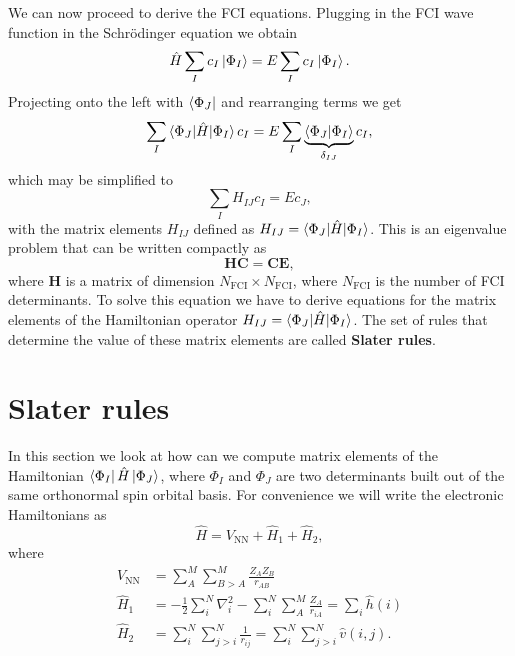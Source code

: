 \documentclass[../Main/chem532-notes.tex]{subfiles}
\begin{document}
We can now proceed to derive the FCI equations.
Plugging in the FCI wave function in the Schr\"{o}dinger equation we obtain
\begin{equation}
\hat{H} \sum_I c_I \ket{\Phi_I} = E \sum_I c_I \ket{\Phi_I}.
\end{equation}
Projecting onto the left with $\bra{\Phi_J}$ and rearranging terms we get
\begin{equation}
 \sum_I \braket{\Phi_J |\hat{H} | \Phi_I} c_I = E \sum_I \underbrace{\braket{\Phi_J | \Phi_I}}_{\delta_{IJ}} c_I,
\end{equation}
which may be simplified to 
\begin{equation}
 \sum_I H_{IJ} c_I = E c_J,
\end{equation}
with the matrix elements $H_{IJ}$ defined as $H_{IJ} = \braket{\Phi_J |\hat{H} | \Phi_I}$.
This is an eigenvalue problem that can be written compactly as
\begin{equation}
\mathbf{H}\mathbf{C} = \mathbf{C} \mathbf{E},
\end{equation}
where $\mathbf{H}$ is a matrix of dimension $N_{\mathrm{FCI}} \times N_{\mathrm{FCI}}$, where $N_{\mathrm{FCI}}$ is the number of FCI determinants.
To solve this equation we have to derive equations for the matrix elements of the Hamiltonian operator $H_{IJ} = \braket{\Phi_J |\hat{H} | \Phi_I}$. The set of rules that determine the value of these matrix elements are called \textbf{Slater rules}.





\section{Slater rules}
In this section we look at how can we compute matrix elements of the Hamiltonian $\bra{\Phi_I} \hat{H} \ket{\Phi_J}$, where $\Phi_I$ and $\Phi_J$ are two determinants built out of the same orthonormal spin orbital basis. 
For convenience we will write the electronic Hamiltonians as
\begin{equation}
\hat{H} = V_\mathrm{NN} + \hat{H}_1 + \hat{H}_2,
\end{equation}
where
\begin{align}
V_\mathrm{NN} &= \sum_{A}^{M} \sum_{B > A}^{M} \frac{Z_A Z_B}{r_{AB}}\\
\hat{H}_1 &= -\frac{1}{2} \sum_i^N \nabla^2_i
- \sum_{i}^{N} \sum_{A}^{M} \frac{Z_A}{r_{iA}} = \sum_i \hat{h}(i)\\
\hat{H}_2 &= \sum_{i}^{N}\sum_{j > i}^{N} \frac{1}{r_{ij}} = \sum_{i}^{N}\sum_{j > i}^{N} \hat{v}(i,j).
\end{align}
\end{document}
